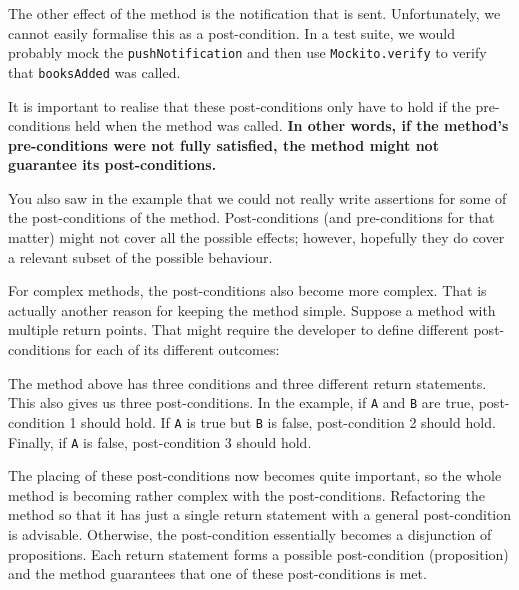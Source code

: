 The other effect of the method is the notification that is sent.
Unfortunately, we cannot easily formalise this as a post-condition. In a
test suite, we would probably mock the \texttt{pushNotification} and
then use \texttt{Mockito.verify} to verify that \texttt{booksAdded} was
called.

It is important to realise that these post-conditions only have to hold
if the pre-conditions held when the method was called. \textbf{In other
words, if the method's pre-conditions were not fully satisfied, the
method might not guarantee its post-conditions.}

You also saw in the example that we could not really write assertions
for some of the post-conditions of the method. Post-conditions (and
pre-conditions for that matter) might not cover all the possible
effects; however, hopefully they do cover a relevant subset of the
possible behaviour.

For complex methods, the post-conditions also become more complex. That
is actually another reason for keeping the method simple. Suppose a
method with multiple return points. That might require the developer to
define different post-conditions for each of its different outcomes:

\begin{Shaded}
\begin{Highlighting}[]
\NormalTok{  \} }\NormalTok{ \{}
\NormalTok{  \}}
\NormalTok{\}}
\end{Highlighting}
\end{Shaded}

The method above has three conditions and three different return
statements. This also gives us three post-conditions. In the example, if
\texttt{A} and \texttt{B} are true, post-condition 1 should hold. If
\texttt{A} is true but \texttt{B} is false, post-condition 2 should
hold. Finally, if \texttt{A} is false, post-condition 3 should hold.

The placing of these post-conditions now becomes quite important, so the
whole method is becoming rather complex with the post-conditions.
Refactoring the method so that it has just a single return statement
with a general post-condition is advisable. Otherwise, the
post-condition essentially becomes a disjunction of propositions. Each
return statement forms a possible post-condition (proposition) and the
method guarantees that one of these post-conditions is met.

